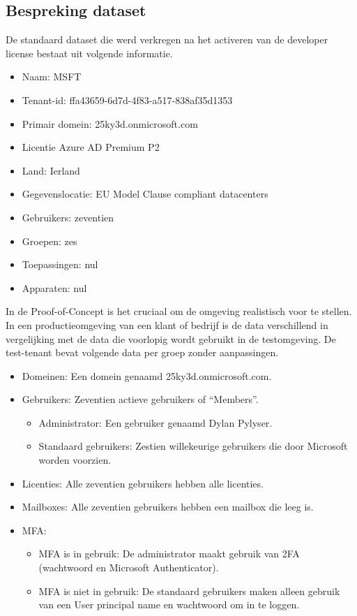 \subsection{Bespreking dataset}


De standaard dataset die werd verkregen na het activeren van de developer license bestaat uit volgende informatie.

\begin{itemize}
    \item Naam: MSFT
    \item Tenant-id: ffa43659-6d7d-4f83-a517-838af35d1353
    \item Primair domein: 25ky3d.onmicrosoft.com
    \item Licentie Azure AD Premium P2
    \item Land: Ierland
    \item Gegevenslocatie: EU Model Clause compliant datacenters
    \item Gebruikers: zeventien
    \item Groepen: zes
    \item Toepassingen: nul
    \item Apparaten: nul
\end{itemize}

In de Proof-of-Concept is het cruciaal om de omgeving realistisch voor te stellen. In een productieomgeving van een klant of bedrijf is de data verschillend in vergelijking met de data die voorlopig wordt gebruikt in de testomgeving. De test-tenant bevat volgende data per groep zonder aanpassingen.

\begin{itemize}
    \item Domeinen: Een domein genaamd 25ky3d.onmicrosoft.com.
    \item Gebruikers: Zeventien actieve gebruikers of “Members”.
    \begin{itemize}
        \item Administrator: Een gebruiker genaamd Dylan Pylyser.
        \item Standaard gebruikers: Zestien willekeurige gebruikers die door Microsoft worden voorzien.
    \end{itemize}
    \item Licenties: Alle zeventien gebruikers hebben alle licenties.
    \item Mailboxes: Alle zeventien gebruikers hebben een mailbox die leeg is.
    \item \Ac{MFA}: 
        \begin{itemize}
            \item \ac{MFA} is in gebruik: De administrator maakt gebruik van \ac{2FA} (wachtwoord en Microsoft Authenticator).
            \item \Ac{MFA} is niet in gebruik: De standaard gebruikers maken alleen gebruik van een User principal name en wachtwoord om in te loggen.
        \end{itemize}
\end{itemize}

